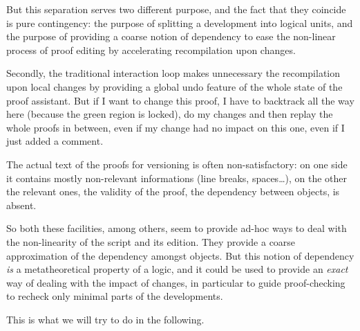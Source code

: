 \documentclass[ignorenonframetext,red]{beamer}
\begin{document}
But this separation serves two different purpose, and the fact that
they coincide is pure contingency: the purpose of splitting a
development into logical units, and the purpose of providing a coarse
notion of dependency to ease the non-linear process of proof editing
by accelerating recompilation upon changes.

Secondly, the traditional interaction loop makes unnecessary the
recompilation upon local changes by providing a global undo feature of
the whole state of the proof assistant. But if I want to change this
proof, I have to backtrack all the way here (because the green region
is locked), do my changes and then replay the whole proofs in between,
even if my change had no impact on this one, even if I just added a
comment.

The actual text of the proofs for versioning is often
non-satisfactory: on one side it contains mostly non-relevant
informations (line breaks, spaces\ldots), on the other the relevant
ones, the validity of the proof, the dependency between objects, is
absent.

So both these facilities, among others, seem to provide ad-hoc ways to
deal with the non-linearity of the script and its edition. They
provide a coarse approximation of the dependency amongst objects. But
this notion of dependency \emph{is} a metatheoretical property of a
logic, and it could be used to provide an \emph{exact} way of dealing
with the impact of changes, in particular to guide proof-checking to
recheck only minimal parts of the developments.

This is what we will try to do in the following.
\end{document}

